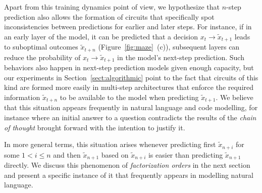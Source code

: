 \documentclass{article}
\theoremstyle{plain}
\theoremstyle{definition}
\theoremstyle{remark}
\begin{document}
Apart from this training dynamics point of view, we hypothesize that $n$-step prediction also allows the formation of circuits that specifically spot inconsistencies between predictions for earlier and later steps. For instance, if in an early layer of the model, it can be predicted that a decision $x_t \to \tilde{x}_{t+1}$ leads to suboptimal outcomes $\tilde{x}_{t+n}$ (Figure~\ref{fig:maze}~(c)), subsequent layers can reduce the probability of $x_t \to \tilde{x}_{t+1}$ in the model's next-step prediction. Such behaviors also happen in next-step prediction models given enough capacity, but our experiments in Section~\ref{sect:algorithmic} point to the fact that circuits of this kind are formed more easily in multi-step architectures that enforce the required information $\tilde{x}_{t+n}$ to be available to the model when predicting $\tilde{x}_{t+1}$. We believe that this situation appears frequently in natural language and code modelling, for instance where an initial answer to a question contradicts the results of the \emph{chain of thought} brought forward with the intention to justify it.

In more general terms, this situation arises whenever predicting first $\tilde{x}_{n+i}$ for some $ 1 < i \leq n$ and then $\tilde{x}_{n+1}$ based on $\tilde{x}_{n+i}$ is easier than predicting $\tilde{x}_{n+1}$ directly. We discuss this phenomenon of \emph{factorization orders} in the next section and present a specific instance of it that frequently appears in modelling natural language.
\end{document}
